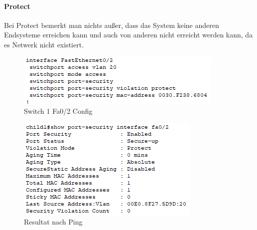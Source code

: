 \paragraph{Protect}
Bei Protect bemerkt man nichts außer, dass das System keine anderen Endsysteme erreichen kann und auch von anderen nicht erreicht werden kann, da es Netwerk nicht existiert. \\
\begin{figure}[!htb]
    \centering
    \includegraphics[width=.95\textwidth,keepaspectratio]{./img/config/security/protect/config.png}
    \caption{Switch 1 Fa0/2 Config}
\end{figure}
\begin{figure}[!htb]
    \centering
    \includegraphics[width=.95\textwidth,height=.5\textwidth,keepaspectratio]{./img/config/security/protect/result.png}
    \caption{Resultat nach Ping}
\end{figure}
\FloatBarrier


